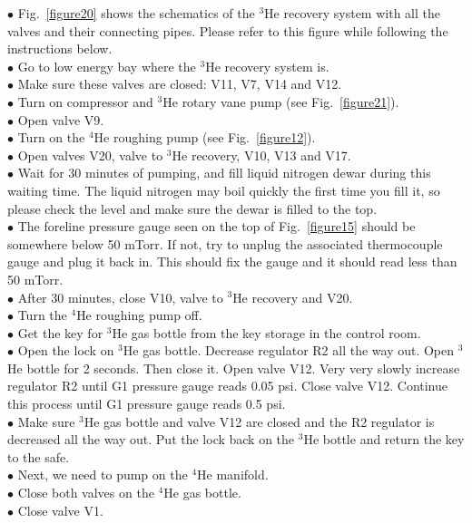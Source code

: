 \documentclass{article}
\begin{document}
$\bullet$ Fig.~\ref{figure20} shows the schematics of the $^{3}$He recovery system with all the valves and their connecting pipes. Please refer to this figure while following the instructions below.\\
$\bullet$ Go to low energy bay where the $^{3}$He recovery system is.\\
$\bullet$ Make sure these valves are closed: V11, V7, V14 and V12.\\
$\bullet$ Turn on compressor and $^{3}$He rotary vane pump (see Fig.~\ref{figure21}).\\
$\bullet$ Open valve V9.\\
$\bullet$ Turn on the $^{4}$He roughing pump (see Fig.~\ref{figure12}).\\
$\bullet$ Open valves V20, valve to $^{3}$He recovery, V10, V13 and V17.\\
$\bullet$ Wait for 30 minutes of pumping, and fill liquid nitrogen dewar during this waiting time. The liquid nitrogen may boil quickly the first time you fill it, so please check the level and make sure the dewar is filled to the top.\\
$\bullet$ The foreline pressure gauge seen on the top of Fig.~\ref{figure15} should be somewhere below 50 mTorr. If not, try to unplug the associated thermocouple gauge and plug it back in. This should fix the gauge and it should read less than 50 mTorr.\\
$\bullet$ After 30 minutes, close V10, valve to $^{3}$He recovery and V20.\\
$\bullet$ Turn the $^{4}$He roughing pump off.\\
$\bullet$ Get the key for $^{3}$He gas bottle from the key storage in the control room.\\
$\bullet$ Open the lock on $^{3}$He gas bottle. Decrease regulator R2 all the way out. Open $^{3}$He bottle for 2 seconds. Then close it. Open valve V12. Very very slowly increase regulator R2 until G1 pressure gauge reads 0.05 psi. Close valve V12. Continue this process until G1 pressure gauge reads 0.5 psi.\\
$\bullet$ Make sure $^{3}$He gas bottle and valve V12 are closed and the R2 regulator is decreased all the way out. Put the lock back on the $^{3}$He bottle and return the key to the safe.\\
$\bullet$ Next, we need to pump on the $^{4}$He manifold.\\
$\bullet$ Close both valves on the $^{4}$He gas bottle.\\
$\bullet$ Close valve V1.\\
\end{document}
